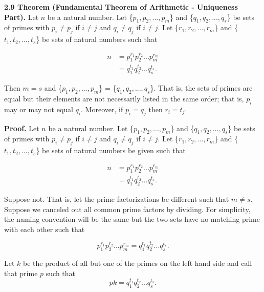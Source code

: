 \documentclass[12pt]{article}
\begin{document}
\noindent\textbf{2.9 Theorem (Fundamental Theorem of Arithmetic - Uniqueness Part).} Let $n$ be a natural number. Let \{$p_{1},p_{2},...,p_{m}$\} and \{$q_{1},q_{2},...,q_{s}$\} be sets of primes with $p_{i}\not= p_{j}$ if $i \not= j$ and $q_{i}\not= q_{j}$ if $i \not= j$. Let \{$r_{1},r_{2},...,r_{m}$\} and \{$t_{1},t_{2},...,t_{s}$\} be sets of natural numbers such that

\begin{align*}
n &= p_{1}^{r_{1}}p_{2}^{r_{2}}...p_{m}^{r_{m}}\\
&= q_{1}^{t_{1}}q_{2}^{t_{2}}...q_{s}^{t_{s}}.
\end{align*}

\noindent Then $m=s$ and \{$p_{1},p_{2},...,p_{m}$\} = \{$q_{1},q_{2},...,q_{s}$\}. That is, the sets of primes are equal but their elements are not necessarily listed in the same order; that is, $p_{i}$ may or may not equal $q_{i}$. Moreover, if $p_{i}=q_{j}$ then $r_{i}=t_{j}$.

\bigskip

\noindent\textbf{Proof.} Let $n$ be a natural number. Let \{$p_{1},p_{2},...,p_{m}$\} and \{$q_{1},q_{2},...,q_{s}$\} be sets of primes with $p_{i}\not= p_{j}$ if $i \not= j$ and $q_{i}\not= q_{j}$ if $i \not= j$. Let \{$r_{1},r_{2},...,r_{m}$\} and \{$t_{1},t_{2},...,t_{s}$\} be sets of natural numbers be given such that

\begin{align*}
n &= p_{1}^{r_{1}}p_{2}^{r_{2}}...p_{m}^{r_{m}}\\
&= q_{1}^{t_{1}}q_{2}^{t_{2}}...q_{s}^{t_{s}}.
\end{align*}

\noindent Suppose not. That is, let the prime factorizations be different such that $m\not= s$. Suppose we canceled out all common prime factors by dividing. For simplicity, the naming convention will be the same but the two sets have no matching prime with each other such that

\begin{equation*}
p_{1}^{r_{1}}p_{2}^{r_{2}}...p_{m}^{r_{m}} = q_{1}^{t_{1}}q_{2}^{t_{2}}...q_{s}^{t_{s}}.
\end{equation*}

\noindent Let $k$ be the product of all but one of the primes on the left hand side and call that prime $p$ such that 
\begin{equation*}
 pk = q_{1}^{t_{1}}q_{2}^{t_{2}}...q_{s}^{t_{s}}.
 \end{equation*} 
\end{document}
